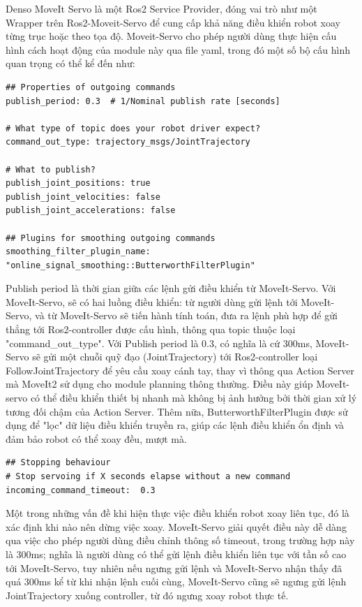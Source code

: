 Denso MoveIt Servo là một Ros2 Service Provider, đóng vai trò như một Wrapper trên Ros2-Moveit-Servo để cung cấp khả năng điều khiển robot xoay từng trục hoặc theo tọa độ. Moveit-Servo cho phép người dùng thực hiện cấu hình cách hoạt động của module này qua file yaml, trong đó một số bộ cấu hình quan trọng có thể kể đến như:

\begin{lstlisting}
## Properties of outgoing commands
publish_period: 0.3  # 1/Nominal publish rate [seconds] 

# What type of topic does your robot driver expect?
command_out_type: trajectory_msgs/JointTrajectory

# What to publish?
publish_joint_positions: true
publish_joint_velocities: false
publish_joint_accelerations: false

## Plugins for smoothing outgoing commands
smoothing_filter_plugin_name: "online_signal_smoothing::ButterworthFilterPlugin"
\end{lstlisting}

Publish period là thời gian giữa các lệnh gửi điều khiển từ MoveIt-Servo. Với MoveIt-Servo, sẽ có hai luồng điều khiển: từ người dùng gửi lệnh tới MoveIt-Servo, và từ MoveIt-Servo sẽ tiến hành tính toán, đưa ra lệnh phù hợp để gửi thẳng tới Ros2-controller được cấu hình, thông qua topic thuộc loại "command\_out\_type". Với Publish period là 0.3, có nghĩa là cứ 300ms, MoveIt-Servo sẽ gửi một chuỗi quỹ đạo (JointTrajectory) tới Ros2-controller loại FollowJointTrajectory để yêu cầu xoay cánh tay, thay vì thông qua Action Server mà MoveIt2 sử dụng cho module planning thông thường. Điều này giúp MoveIt-servo có thể điều khiển thiết bị nhanh mà không bị ảnh hưởng bởi thời gian xử lý tương đối chậm của Action Server. Thêm nữa, ButterworthFilterPlugin được sử dụng để "lọc" dữ liệu điều khiển truyền ra, giúp các lệnh điều khiển ổn định và đảm bảo robot có thể xoay đều, mượt mà. 

\begin{lstlisting}
## Stopping behaviour
# Stop servoing if X seconds elapse without a new command
incoming_command_timeout:  0.3  
\end{lstlisting}

Một trong những vấn đề khi hiện thực việc điều khiển robot xoay liên tục, đó là xác định khi nào nên dừng việc xoay. MoveIt-Servo giải quyết điều này dễ dàng qua việc cho phép người dùng điều chỉnh thông số timeout, trong trường hợp này là 300ms; nghĩa là người dùng có thể gửi lệnh điều khiển liên tục với tần số cao tới MoveIt-Servo, tuy nhiên nếu ngưng gửi lệnh và MoveIt-Servo nhận thấy đã quá 300ms kể từ khi nhận lệnh cuối cùng, MoveIt-Servo cũng sẽ ngưng gửi lệnh JointTrajectory xuống controller, từ đó ngưng xoay robot thực tế. 


